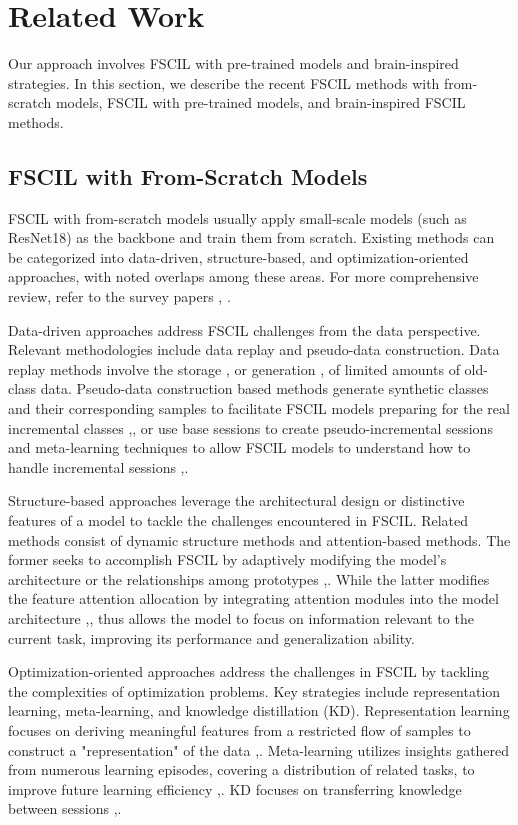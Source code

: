 \section{Related Work}
\label{sec:relatedwork}
Our approach involves FSCIL with pre-trained models and brain-inspired strategies. In this section, we describe the recent FSCIL methods with from-scratch models, FSCIL with pre-trained models, and brain-inspired FSCIL methods.
\subsection{FSCIL with From-Scratch Models}
FSCIL with from-scratch models usually apply small-scale models (such as ResNet18) as the backbone and train them from scratch. Existing methods can be categorized into data-driven, structure-based, and optimization-oriented approaches, with noted overlaps among these areas. For more comprehensive review, refer to the survey papers \cite{tian2024survey}, \cite{zhang2025few}. 

Data-driven approaches address FSCIL challenges from the data perspective. Relevant methodologies include data replay and pseudo-data construction. Data replay methods involve the storage \cite{kukleva2021generalized},\cite{zhu2022feature} or generation \cite{liu2022few},\cite{shankarampeta2021few} of limited amounts of old-class data. Pseudo-data construction  based methods generate synthetic classes and their corresponding samples to facilitate FSCIL models preparing for the real
incremental classes \cite{zhou2022forward},\cite{peng2022few}, or use base sessions to create pseudo-incremental sessions and meta-learning techniques to allow FSCIL models to understand how to handle incremental sessions \cite{zhang2021few},\cite{zhu2021self}.

Structure-based approaches leverage the architectural design or distinctive features of a model to tackle the challenges encountered in FSCIL. Related methods consist of dynamic structure methods and attention-based methods. The former seeks to accomplish FSCIL by adaptively modifying the model's architecture or the relationships among prototypes \cite{tao2020few},\cite{yang2022dynamic}. While the latter modifies the feature attention allocation by integrating attention modules into the model architecture \cite{zhao2023few},\cite{zhou2022few}, thus allows the model to focus on information relevant to the current task, improving its performance and generalization ability.

Optimization-oriented approaches address the challenges in FSCIL by tackling the complexities of optimization problems. Key strategies include representation learning, meta-learning, and knowledge distillation (KD). Representation learning focuses on deriving meaningful features from a restricted flow of samples to construct a "representation" of the data \cite{mazumder2021few},\cite{hersche2022constrained}. Meta-learning utilizes insights gathered from numerous learning episodes, covering a distribution of related tasks, to improve future learning efficiency \cite{zheng2021few},\cite{zhou2022few}. KD focuses on transferring knowledge between sessions \cite{dong2021few},\cite{cheraghian2021semantic}. 

